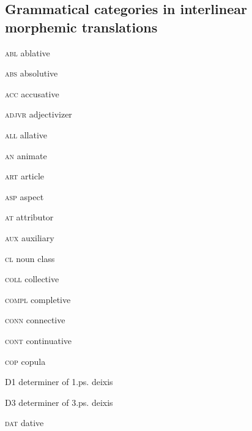 \begin{refsection}

%
%
%
%	
%	
%	
%	
%	
%	
%	
%	
%	
%	
%	
%	
%	
%	
%	
%	
%	
%	
%	
%	
%	
%	
%	
%	
%	
%	

\section*{Grammatical categories in interlinear morphemic translations}

\begin{multicols}{2}
	\textsc{abl}  ablative
	
	\textsc{abs}  absolutive
	
	\textsc{acc}  accusative
	
	\textsc{adjvr}  adjectivizer
	
	\textsc{all}  allative
	
	\textsc{an}  animate
	
	\textsc{art}  article
	
	\textsc{asp}  aspect
	
	\textsc{at}  attributor
	
	\textsc{aux}  auxiliary
	
	\textsc{cl}  noun class
	
	\textsc{coll}  collective
	
	\textsc{compl}  completive
	
	\textsc{conn}  connective
	
	\textsc{cont}  continuative
	
	\textsc{cop}  copula
	
	\textsc{D1}  determiner of 1.ps. deixis
	
	\textsc{D3}  determiner of 3.ps. deixis
	
	\textsc{dat}  dative
	

\end{multicols}
\end{refsection}
